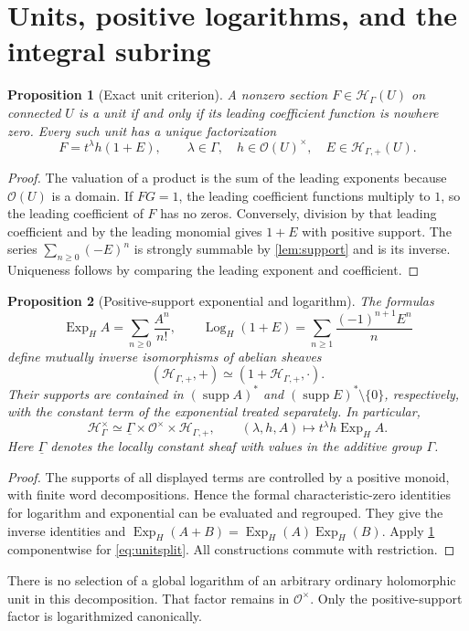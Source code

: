 \documentclass[11pt,letterpaper]{article}
\newtheorem{proposition}[proposition]{Proposition}
\theoremstyle{definition}
\theoremstyle{remark}
\newcommand{\OO}{\mathcal O}
\newcommand{\HH}{\mathscr H_\Gamma}
\newcommand{\HP}{\mathscr H_{\Gamma,+}}
\newcommand{\supp}{\operatorname{supp}}
\newcommand{\ExpH}{\operatorname{Exp}_{H}}
\newcommand{\LogH}{\operatorname{Log}_{H}}
\numberwithin{equation}{section}
\begin{document}
\section{Units, positive logarithms, and the integral subring}\label{sec:units}
\begin{proposition}[Exact unit criterion]\label{prop:units}
A nonzero section $F\in\HH(U)$ on connected $U$ is a unit if and only if its leading coefficient function is nowhere zero. Every such unit has a unique factorization
\begin{equation}\label{eq:unitfactor}
 F=t^\lambda h(1+E),\qquad
 \lambda\in\Gamma,\quad h\in\OO(U)^\times,\quad E\in\HP(U).
\end{equation}
\end{proposition}
\begin{proof}
The valuation of a product is the sum of the leading exponents because $\OO(U)$ is a domain. If $FG=1$, the leading coefficient functions multiply to $1$, so the leading coefficient of $F$ has no zeros. Conversely, division by that leading coefficient and by the leading monomial gives $1+E$ with positive support. The series $\sum_{n\ge0}(-E)^n$ is strongly summable by \cref{lem:support} and is its inverse. Uniqueness follows by comparing the leading exponent and coefficient.
\end{proof}

\begin{proposition}[Positive-support exponential and logarithm]\label{prop:explog}
The formulas
\begin{equation}\label{eq:explog}
 \ExpH A=\sum_{n\ge0}\frac{A^n}{n!},\qquad
 \LogH(1+E)=\sum_{n\ge1}\frac{(-1)^{n+1}E^n}{n}
\end{equation}
define mutually inverse isomorphisms of abelian sheaves
\[
 (\HP,+)\simeq(1+\HP,\cdot).
\]
Their supports are contained in $(\supp A)^*$ and $(\supp E)^*\setminus\{0\}$, respectively, with the constant term of the exponential treated separately. In particular,
\begin{equation}\label{eq:unitsplit}
 \HH^\times\simeq\underline\Gamma\times\OO^\times\times\HP,
 \qquad (\lambda,h,A)\longmapsto t^\lambda h\ExpH A.
\end{equation}
Here $\underline\Gamma$ denotes the locally constant sheaf with values in the additive group $\Gamma$.
\end{proposition}
\begin{proof}
The supports of all displayed terms are controlled by a positive monoid, with finite word decompositions. Hence the formal characteristic-zero identities for logarithm and exponential can be evaluated and regrouped. They give the inverse identities and $\ExpH(A+B)=\ExpH(A)\ExpH(B)$. Apply \cref{prop:units} componentwise for \eqref{eq:unitsplit}. All constructions commute with restriction.
\end{proof}
There is no selection of a global logarithm of an arbitrary ordinary holomorphic unit in this decomposition. That factor remains in $\OO^\times$. Only the positive-support factor is logarithmized canonically.
\end{document}
